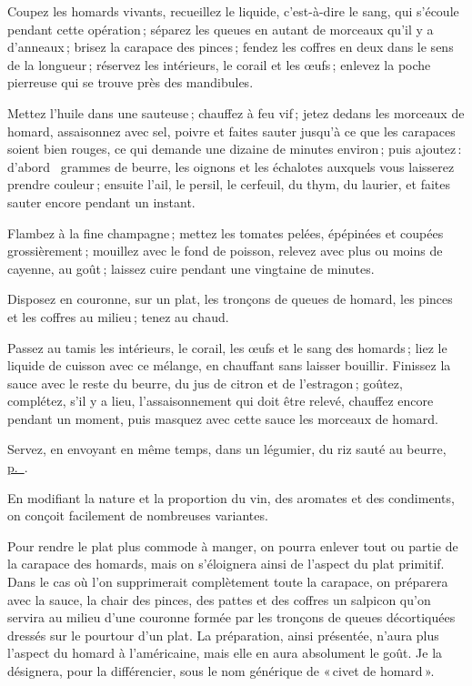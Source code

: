 Coupez les homards vivants, recueillez le liquide, c'est-à-dire le sang, qui
s'écoule pendant cette opération ; séparez les queues en autant de morceaux
qu'il y a d’anneaux ; brisez la carapace des pinces ; fendez les coffres en
deux dans le sens de la longueur ; réservez les intérieurs, le corail et les
œufs ; enlevez la poche pierreuse qui se trouve près des mandibules.

Mettez l'huile dans une sauteuse ; chauffez à feu vif ; jetez dedans les
morceaux de homard, assaisonnez avec sel, poivre et faites sauter jusqu'à ce
que les carapaces soient bien rouges, ce qui demande une dizaine de minutes
environ ; puis ajoutez : d'abord {\mmm} grammes de beurre, les oignons et les
échalotes auxquels vous laisserez prendre couleur ; ensuite l'ail, le persil,
le cerfeuil, du thym, du laurier, et faites sauter encore pendant un instant.

Flambez à la fine champagne ; mettez les tomates pelées, épépinées et coupées
grossièrement ; mouillez avec le fond de poisson, relevez avec plus ou moins de
cayenne, au goût ; laissez cuire pendant une vingtaine de minutes.

Disposez en couronne, sur un plat, les tronçons de queues de homard, les
pinces et les coffres au milieu ; tenez au chaud.

Passez au tamis les intérieurs, le corail, les œufs et le sang des homards ;
liez le liquide de cuisson avec ce mélange, en chauffant sans laisser bouillir.
Finissez la sauce avec le reste du beurre, du jus de citron et de l’estragon ;
goûtez, complétez, s'il y a lieu, l'assaisonnement qui doit être relevé,
chauffez encore pendant un moment, puis masquez avec cette sauce les morceaux
de homard.

Servez, en envoyant en même temps, dans un légumier, du riz sauté au beurre,
\hyperlink{p0710}{p. \pageref{pg0710}}.

\sk

En modifiant la nature et la proportion du vin, des aromates et des condiments,
on conçoit facilement de nombreuses variantes.

\sk

Pour rendre le plat plus commode à manger, on pourra enlever tout ou partie de
la carapace des homards, mais on s'éloignera ainsi de l'aspect du plat
primitif. Dans le cas où l’on supprimerait complètement toute la carapace, on
préparera avec la sauce, la chair des pinces, des pattes et des coffres un
salpicon qu'on servira au milieu d'une couronne formée par les tronçons de
queues décortiquées dressés sur le pourtour d'un plat. La préparation, ainsi
présentée, n'aura plus l'aspect du homard à l'américaine, mais elle en aura
absolument le goût. Je la désignera, pour la différencier, sous le nom
générique de « civet de homard ».

